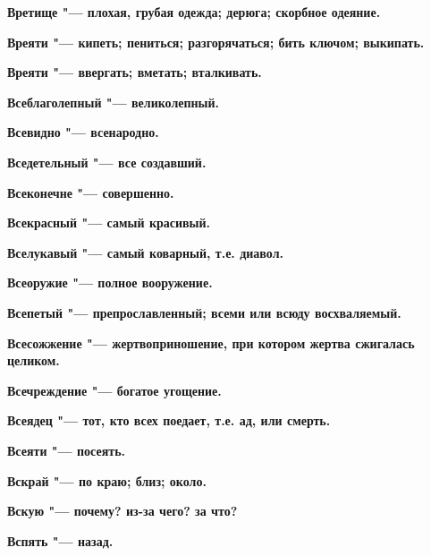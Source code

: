 \bfseries Вретище \normalfont{} "--- плохая, грубая одежда; дерюга; скорбное одеяние. 




\bfseries Вреяти \normalfont{} "--- кипеть; пениться; разгорячаться; бить ключом; выкипать. 




\bfseries Вреяти \normalfont{} "--- ввергать; вметать; вталкивать. 




\bfseries Всеблаголепный \normalfont{} "--- великолепный. 




\bfseries Всевидно \normalfont{} "--- всенародно. 




\bfseries Вседетельный \normalfont{} "--- все создавший. 




\bfseries Всеконечне \normalfont{} "--- совершенно. 




\bfseries Всекрасный \normalfont{} "--- самый красивый. 




\bfseries Вселукавый \normalfont{} "--- самый коварный, т.е. диавол. 




\bfseries Всеоружие \normalfont{} "--- полное вооружение. 




\bfseries Всепетый \normalfont{} "--- препрославленный; всеми или всюду восхваляемый. 




\bfseries Всесожжение \normalfont{} "--- жертвоприношение, при котором жертва сжигалась целиком. 




\bfseries Всечреждение \normalfont{} "--- богатое угощение. 




\bfseries Всеядец \normalfont{} "--- тот, кто всех поедает, т.е. ад, или смерть. 




\bfseries Всеяти \normalfont{} "--- посеять. 




\bfseries Вскрай \normalfont{} "--- по краю; близ; около. 




\bfseries Вскую \normalfont{} "--- почему? из-за чего? за что? 




\bfseries Вспять \normalfont{} "--- назад. 




